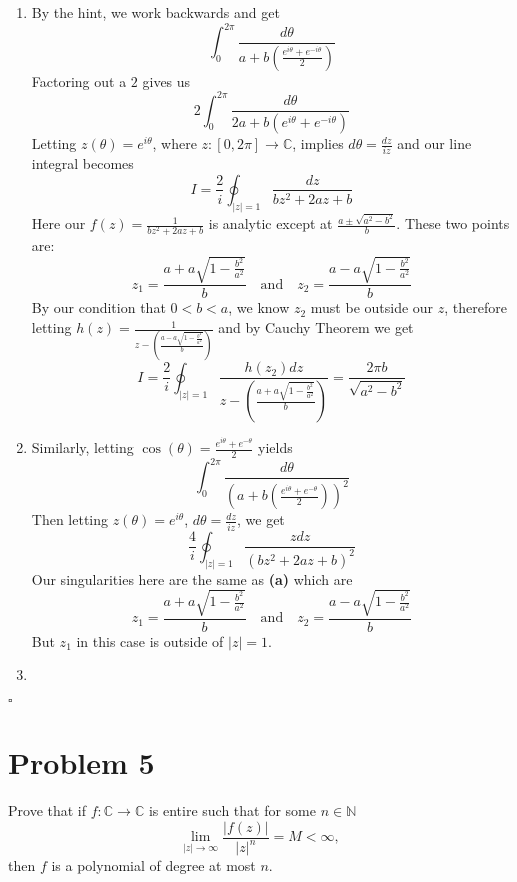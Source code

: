 \documentclass[12pt]{article}
\newcommand{\N}{\mathbb{N}}
\newcommand{\C}{\mathbb{C}}
\newenvironment{proof}{\noindent{\bf Proof.}}{\hfill $\square$\medskip}
\begin{document}
\begin{proof}
    \begin{enumerate}[label=\textbf{(\alph*)}]
        \item By the hint, we work backwards and get 
        $$\int_{0}^{2\pi}\frac{d\theta}{a+b\left(\frac{e^{i\theta}+e^{-i\theta}}{2}\right)}$$
        Factoring out a $2$ gives us
        $$2\int_{0}^{2\pi}\frac{d\theta}{2a+b\left(e^{i\theta}+e^{-i\theta}\right)}$$
        Letting $z(\theta)=e^{i\theta}$, where $z:[0,2\pi]\to\C$, implies
        $d\theta=\frac{dz}{iz}$ and our line integral becomes
        $$I=\frac{2}{i}\oint_{\left|z\right|=1}\frac{dz}{bz^{2}+2az+b}$$ Here
        our $f(z)=\frac{1}{bz^{2}+2az+b}$ is analytic except at
        $\frac{a\pm\sqrt{a^{2}-b^{2}}}{b}$. These two points are:
        $$z_{1}=\frac{a+a\sqrt{1-\frac{b^{2}}{a^{2}}}}{b}\quad\text{and}\quad
        z_{2}=\frac{a-a\sqrt{1-\frac{b^{2}}{a^{2}}}}{b}$$ By our condition that
        $0<b<a$, we know $z_{2}$ must be outside our $z$, therefore letting
        $h(z)=\frac{1}{z-\left(\frac{a-a\sqrt{1-\frac{b^{2}}{a^{2}}}}{b}\right)}$
        and by Cauchy Theorem we get
        $$I=\frac{2}{i}\oint_{\left|z\right|=1}\frac{h(z_{2})dz}{z-\left(\frac{a+a\sqrt{1-\frac{b^{2}}{a^{2}}}}{b}\right)}=\frac{2\pi
        b}{\sqrt{a^{2}-b^{2}}}$$
        \item Similarly, letting $\cos(\theta)=\frac{e^{i\theta}+e^{-\theta}}{2}$ yields
        $$\int_{0}^{2\pi}\frac{d\theta}{\left(a+b\left(\frac{e^{i\theta}+e^{-\theta}}{2}\right)\right)^{2}}$$
        Then letting $z(\theta)=e^{i\theta}$, $d\theta=\frac{dz}{iz}$, we get
        $$\frac{4}{i}\oint_{\left|z\right|=1}\frac{zdz}{(bz^{2}+2az+b)^{2}}$$
        Our singularities here are the same as \textbf{(a)} which are
        $$z_{1}=\frac{a+a\sqrt{1-\frac{b^{2}}{a^{2}}}}{b}\quad\text{and}\quad
        z_{2}=\frac{a-a\sqrt{1-\frac{b^{2}}{a^{2}}}}{b}$$
        But $z_{1}$ in this case is outside of $\left|z\right|=1$.
        \item
    \end{enumerate}
\end{proof}


\section{Problem 5}
Prove that if $f:\C\rightarrow\C$ is entire such that for some $n\in\N$
$$\lim_{\left |z\right |\to\infty}\frac{\left |f(z)\right |}{\left |z\right |^{n}}=M<\infty,$$
then $f$ is a polynomial of degree at most $n$.
\end{document}
